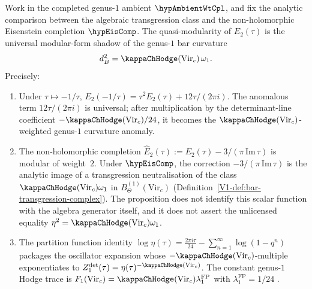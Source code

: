 \begin{proposition}
\label{prop:genus1-modular-anomaly}
Work in the completed genus-$1$ ambient \(\hypAmbientWtCpl\), and fix
the analytic comparison between the algebraic transgression class and
the non-holomorphic Eisenstein completion \(\hypEisComp\).  The
quasi-modularity of \(E_2(\tau)\) is the universal modular-form
shadow of the genus-$1$ bar curvature
\[
d^2_{\bar B}=\kappaChHodge(\mathrm{Vir}_c)\,\omega_1 .
\]
Precisely:
\begin{enumerate}[label=\textup{(\roman*)}]
\item Under $\tau \mapsto -1/\tau$,
 $E_2(-1/\tau) = \tau^2 E_2(\tau) + 12\tau/(2\pi i)$.
 The anomalous term \(12\tau/(2\pi i)\) is universal; after
 multiplication by the determinant-line coefficient
 \(-\kappaChHodge(\mathrm{Vir}_c)/24\), it becomes the
 \(\kappaChHodge(\mathrm{Vir}_c)\)-weighted genus-$1$ curvature
 anomaly.
\item The non-holomorphic completion
 $\widehat{E}_2(\tau) := E_2(\tau) - 3/(\pi\,\mathrm{Im}\,\tau)$
 is modular of weight~$2$. Under \(\hypEisComp\), the correction
 $-3/(\pi\,\mathrm{Im}\,\tau)$ is the analytic image of a
 transgression neutralisation of the class
 \(\kappaChHodge(\mathrm{Vir}_c)\omega_1\) in
 \(B_\Theta^{(1)}(\mathrm{Vir}_c)\)
 (Definition~\ref{V1-def:bar-transgression-complex}).  The proposition
 does not identify this scalar function with the algebra generator
 itself, and it does not assert the unlicensed equality
 \(\eta^2=\kappaChHodge(\mathrm{Vir}_c)\omega_1\).
\item The partition function identity
 $\log\eta(\tau)
 = \frac{2\pi i\tau}{24}
 - \sum_{n=1}^\infty \log(1-q^n)$
 packages the oscillator expansion whose
 \(-\kappaChHodge(\mathrm{Vir}_c)\)-multiple exponentiates to
 \(Z^{\mathrm{det}}_1(\tau)=
 \eta(\tau)^{-\kappaChHodge(\mathrm{Vir}_c)}\). The
constant genus-$1$ Hodge trace is
 $F_1(\mathrm{Vir}_c)
 = \kappaChHodge(\mathrm{Vir}_c)\lambda_1^{\mathrm{FP}}$
 with $\lambda_1^{\mathrm{FP}} = 1/24$ .
\end{enumerate}
\end{proposition}

